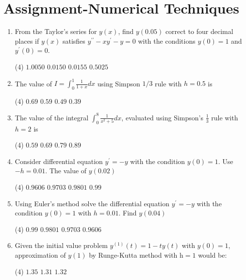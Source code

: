 \chapter{Assignment-Numerical Techniques}
\begin{enumerate}
	\item From the Taylor's series for $y(x)$, find $y(0.05)$ correct to four decimal places if $y(x)$ satisfies $y^{\prime \prime}-x y^{\prime}-y=0$ with the conditions $y(0)=1$ and $y^{\prime}(0)=0$.
 \begin{tasks}(4)
	\task[\textbf{a.}]$1.0050$
	\task[\textbf{b.}]$0.0150$
	\task[\textbf{c.}] $0.0155$
	\task[\textbf{d.}]  $0.5025$
\end{tasks}	
	\item The value of $I=\int_{0}^{1} \frac{1}{1+x} d x$ using Simpson $1 / 3$ rule with $h=0.5$ is
	 \begin{tasks}(4)
		\task[\textbf{a.}]$0.69$
		\task[\textbf{b.}]$0.59$
		\task[\textbf{c.}]$0.49$
		\task[\textbf{d.}]  $0.39$
	\end{tasks}
	\item The value of the integral $\int_{0}^{8} \frac{1}{x^{2}+5} d x$, evaluated using Simpson's $\frac{1}{3}$ rule with $h=2$ is
	 \begin{tasks}(4)
		\task[\textbf{a.}]$0.59$
		\task[\textbf{b.}]$0.69$
		\task[\textbf{c.}] $0.79$
		\task[\textbf{d.}] $0.89$
	\end{tasks}
	\item Consider differential equation $y^{\prime}=-y$ with the condition $y(0)=1$. Use $-h=0.01$. The value of $y(0.02)$
	 \begin{tasks}(4)
		\task[\textbf{a.}]$0.9606$
		\task[\textbf{b.}] $0.9703$
		\task[\textbf{c.}]$0.9801$
		\task[\textbf{d.}] $0.99$
	\end{tasks}
	\item Using Euler's method solve the differential equation $y^{\prime}=-y$ with the condition $y(0)=1$ with $h=0.01$. Find $y(0.04)$
	 \begin{tasks}(4)
		\task[\textbf{a.}]$0.99$
		\task[\textbf{b.}] $0.9801$
		\task[\textbf{c.}]$0.9703$
		\task[\textbf{d.}] $0.9606$
	\end{tasks}
	\item Given the initial value problem $y^{(1)}(t)=1-t y(t)$ with $y(0)=1$, approximation of $y(1)$ by Runge-Kutta method with $\mathrm{h}=1$ would be:
	 \begin{tasks}(4)
		\task[\textbf{a.}]$1.35$
		\task[\textbf{b.}]$1.31$
		\task[\textbf{c.}]$1.32$

\end{tasks}
\end{enumerate}
